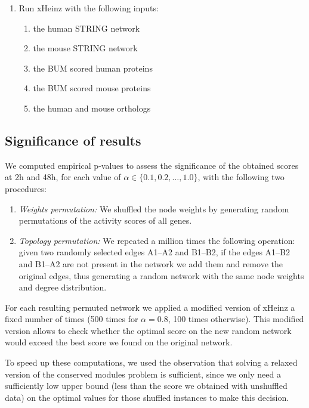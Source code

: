 \begin{enumerate}
\begin{enumerate}
\begin{enumerate}
        \item Run xHeinz with the following inputs: 
        \begin{enumerate} 
          \item the human STRING network 
          \item the mouse STRING network
          \item the BUM scored human proteins
          \item the BUM scored mouse proteins
          \item the human and mouse orthologs
        \end{enumerate}
      \end{enumerate}
    \end{enumerate}
  \end{enumerate}

  \subsection{Significance of results}
  \label{app:significance}

  We computed empirical p-values to assess the significance of
  the obtained scores at \unit{2}{h} and \unit{48}{h}, for each value of
  $\alpha \in \{0.1, 0.2, \ldots, 1.0\}$, with the following two procedures:
  \begin{enumerate}
    \item \emph{Weights permutation:} We shuffled the node weights by generating random permutations of the activity scores of all genes.
    \item \emph{Topology permutation:} We repeated a million times the following operation: given two randomly selected edges A1--A2 and B1--B2, if the edges A1--B2 and B1--A2 are not present in the network we add them and remove the original edges, thus generating a random network with the same node weights and degree distribution.
  \end{enumerate}

  For each resulting permuted network we applied a modified version of xHeinz a
  fixed number of times (500 times for $\alpha = 0.8$, 100 times otherwise). This
  modified version allows to check whether the optimal score on the new random
  network would exceed the best score we found on the original network.

  To speed up these computations, we used the observation that solving a relaxed
  version of the conserved modules problem is sufficient, since we only need a
  sufficiently low upper bound (less than the score we obtained with unshuffled
  data) on the optimal values for those shuffled instances to make this decision.
  
